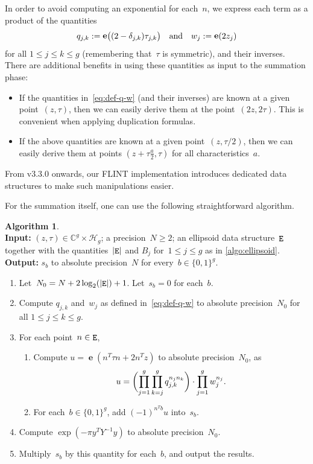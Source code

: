 \documentclass[12pt,oneside]{amsart}
\numberwithin{equation}{section}
\theoremstyle{definition}
\newtheorem{algorithm}[equation]{Algorithm}
\newcommand{\algoinput}[1]{~\\ \noindent\textbf{Input:} #1}
\newcommand{\algooutput}[1]{~\\ \noindent\textbf{Output:} #1}
\newcommand{\C}{\mathbb{C}}
\newcommand{\Half}{\mathcal{H}}
\DeclareMathOperator{\E}{\tt E}
\DeclareMathOperator{\e}{\mathbf{e}}
\DeclarePairedDelimiter{\abs}{|}{|}
\DeclarePairedDelimiter{\paren}{(}{)}
\begin{document}
In order to avoid computing an exponential for each~$n$, we express each term
as a product of the quantities
\begin{equation}
  \label{eq:def-q-w}
  q_{j,k} := \e\paren[\big]{(2 - \delta_{j,k})\tau_{j,k}} \quad \text{and}\quad w_j := \e(2 z_j)
\end{equation}
for all $1\leq j\leq k\leq g$ (remembering that~$\tau$ is symmetric), and their
inverses. There are additional benefits in using these quantities as input to
the summation phase:
\begin{itemize}
\item If the quantities in~\eqref{eq:def-q-w} (and their inverses) are known at
  a given point~$(z,\tau)$, then we can easily derive them at the
  point~$(2z,2\tau)$. This is convenient when applying duplication formulas.
\item If the above quantities are known at a given point~$(z,\tau/2)$, then we
  can easily derive them at points $(z + \tau \tfrac a2,\tau)$ for all
  characteristics~$a$.
\end{itemize}
From v3.3.0 onwards, our FLINT implementation introduces dedicated data
structures to make such manipulations easier.

For the summation itself, one can use the following straightforward algorithm.

\begin{algorithm}
  \label{algo:sum-naive}
  \algoinput{$(z,\tau)\in \C^g\times \Half_g$; a precision~$N\geq 2$; an
    ellipsoid data structure~$\E$ together with the quantities~$\abs{\E}$ and
    $B_j$ for~$1\leq j\leq g$ as in \cref{algo:ellipsoid}.} \algooutput{$s_b$
    to absolute precision~$N$ for every~$b\in \{0,1\}^g$.}
  \begin{enumerate}
  \item Let~$N_0 = N + 2 \log_2(\abs{\E}) + 1$. Let~$s_b = 0$ for each~$b$.
  \item Compute $q_{j,k}$ and~$w_j$ as defined in~\eqref{eq:def-q-w} to
    absolute precision~$N_0$ for all $1\leq j\leq k\leq g$.
  \item \label{step:sum-naive-exp} For each point~$n\in \E$,
    \begin{enumerate}
    \item Compute $u = \e(n^T\tau n + 2 n^T z)$ to absolute precision~$N_0$, as
      \begin{displaymath}
        u = \paren[\bigg]{\prod_{j = 1}^g \prod_{k=j}^g q_{j,k}^{n_j n_k}}\cdot \prod_{j = 1}^{g} w_j^{n_j}.
      \end{displaymath}
    \item For each~$b\in \{0,1\}^g$, add $(-1)^{n^Tb}u$ into~$s_b$.
    \end{enumerate}
  \item \label{step:sum-naive-mul} Compute $\exp(-\pi y^T Y^{-1} y)$ to
    absolute precision~$N_0$.
  \item Multiply~$s_b$ by this quantity for each~$b$, and output the results.
  \end{enumerate}
\end{algorithm}
\end{document}
